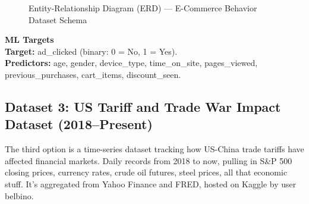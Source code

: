 \documentclass[11pt,a4paper]{article}
\begin{document}
\begin{figure}[H]
\centering
{}
\caption{Entity-Relationship Diagram (ERD) ---
         E-Commerce Behavior Dataset Schema}
\label{fig:erd}
\end{figure}

\begin{mlbox}
\textbf{\color{black} ML Targets}\\
\textbf{Target:} ad\_clicked (binary: 0 = No, 1 = Yes).\\
\textbf{Predictors:} age, gender, device\_type, time\_on\_site, pages\_viewed,
previous\_purchases, cart\_items, discount\_seen.
\end{mlbox}

\vspace{0.5cm}

\subsection{Dataset 3: US Tariff and Trade War Impact Dataset (2018--Present)}

The third option is a time-series dataset tracking how US-China trade tariffs have affected 
financial markets. Daily records from 2018 to now, pulling in S\&P 500 closing prices, 
currency rates, crude oil futures, steel prices, all that economic stuff. It's aggregated 
from Yahoo Finance and FRED, hosted on Kaggle by user belbino.
\end{document}
